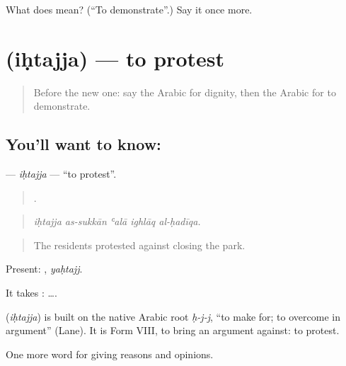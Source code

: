 \begin{tcolorbox}[breakable,colback=teal!4,colframe=teal!35!black,title={Before you move on}]
What does  mean? (\textquotedblleft{}To demonstrate\textquotedblright{}.) Say it once more.
\end{tcolorbox}
\section[\texorpdfstring{\ar{احتج} (iḥtajja)}{احتج (iḥtajja)}]{ (iḥtajja) — to protest}

\label{lesson:AR-C382-ihtajja}



\begin{quote}
Before the new one: say the Arabic for dignity, then the Arabic for to demonstrate.
\end{quote}

\subsection*{You'll want to know: }
\textbf{} — \emph{iḥtajja} — \textquotedblleft{}to protest\textquotedblright{}.

\begin{quote}
    .
\end{quote}

\begin{quote}
\emph{iḥtajja as-sukkān ʿalā ighlāq al-ḥadīqa.}
\end{quote}

\begin{quote}
The residents protested against closing the park.
\end{quote}

Present: , \emph{yaḥtajj}.

It takes :   ….

\begin{cousinweb}
\textbf{} (\emph{iḥtajja}) is built on the native Arabic root \emph{ḥ-j-j}, \textquotedblleft{}to make for; to overcome in argument\textquotedblright{} (Lane). It is Form VIII, to bring an argument against: to protest.
\end{cousinweb}

\begin{grammarlens}[title={What you've built}]
One more word for giving reasons and opinions.
\end{grammarlens}

